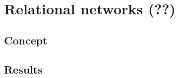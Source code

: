 \chapter{Relational networks (??)}
\label{ch:Relational_networks}

\section{Concept}

\section{Results}